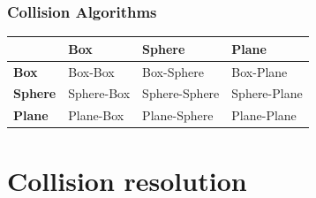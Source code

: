 \documentclass[12p, paper=a4, leqno, colorinlistoftodos]{article}
\begin{document}
			\subsubsection{Collision Algorithms}
			\begin{table}[ht]
				\begin{tabular}{|l || l | l | l |}
					\hline
					& \textbf{Box} & \textbf{Sphere} & \textbf{Plane}\\
					\hline
					\hline
					\textbf{Box} & Box-Box & Box-Sphere & Box-Plane\\
					\hline
					\textbf{Sphere} & Sphere-Box & Sphere-Sphere & Sphere-Plane\\
					\hline
					\textbf{Plane}& Plane-Box & Plane-Sphere & Plane-Plane\\
					\hline
				\end{tabular}
			\end{table}
	
	\pagebreak
	\section{Collision resolution}
	
	
	
	
	
	
	\newpage
	\appendix
	\listoffigures
	\listoftables
	
	
\end{document}
